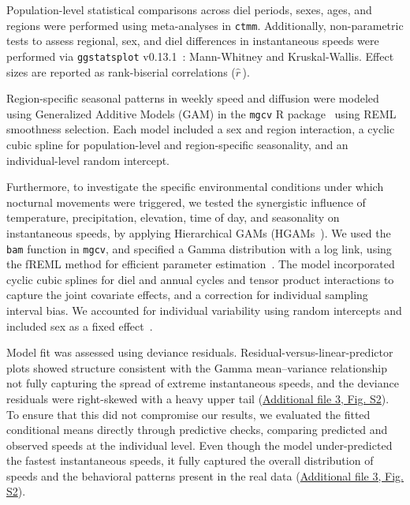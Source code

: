\documentclass[lineno,referee,pdflatex,sn-vancouver-num]{sn-jnl}%
\theoremstyle{thmstyleone}%
\theoremstyle{thmstyletwo}%
\theoremstyle{thmstylethree}%
\begin{document}
Population-level statistical comparisons across diel periods, sexes, ages, and regions were performed using meta-analyses in \texttt{ctmm}. Additionally, non-parametric tests to assess regional, sex, and diel differences in instantaneous speeds were performed via \texttt{ggstatsplot} v0.13.1~\cite{patilVisualizationsStatisticalDetails2021}: Mann-Whitney and Kruskal-Wallis. Effect sizes are reported as rank-biserial correlations ($\widehat{r}^{\,}$).

Region-specific seasonal patterns in weekly speed and diffusion were modeled using Generalized Additive Models (GAM) in the \texttt{mgcv} R package~\cite{woodGeneralizedAdditiveModels} using REML smoothness selection. Each model included a sex and region interaction, a cyclic cubic spline for population-level and region-specific seasonality, and an individual-level random intercept.

Furthermore, to investigate the specific environmental conditions under which nocturnal movements were triggered, we tested the synergistic influence of temperature, precipitation, elevation, time of day, and seasonality on instantaneous speeds, by applying Hierarchical GAMs (HGAMs~\cite{pedersenHierarchicalGeneralizedAdditive2019}). We used the \texttt{bam} function in \texttt{mgcv}, and specified a Gamma distribution with a log link, using the fREML method for efficient parameter estimation~\cite{woodGeneralizedAdditiveModels2015,woodGeneralizedAdditiveModels2017}. The model incorporated cyclic cubic splines for diel and annual cycles and tensor product interactions to capture the joint covariate effects, and a correction for individual sampling interval bias. We accounted for individual variability using random intercepts and included sex as a fixed effect~\cite{pedersenHierarchicalGeneralizedAdditive2019}.

Model fit was assessed using deviance residuals. Residual-versus-linear-predictor plots showed structure consistent with the Gamma mean–variance relationship not fully capturing the spread of extreme instantaneous speeds, and the deviance residuals were right-skewed with a heavy upper tail (\hyperref[S3_File]{Additional file 3, Fig. S2}). To ensure that this did not compromise our results, we evaluated the fitted conditional means directly through predictive checks, comparing predicted and observed speeds at the individual level. Even though the model under-predicted the fastest instantaneous speeds, it fully captured the overall distribution of speeds and the behavioral patterns present in the real data (\hyperref[S3_File]{Additional file 3, Fig. S2}).
\end{document}
